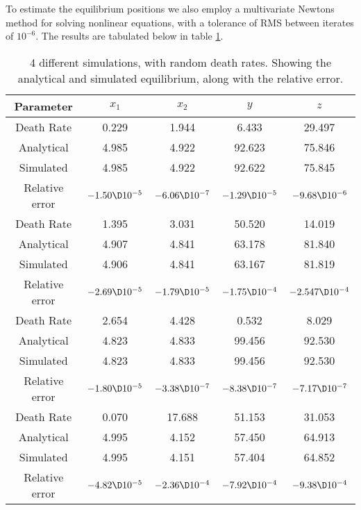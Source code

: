 \documentclass[a4paper,10pt]{article}
\begin{document}
	To estimate the equilibrium positions we also employ a multivariate Newtons method for solving nonlinear equations, with a tolerance of RMS between iterates of $ 10^{-6} $. The results are tabulated below in table \ref{tab:deaths}.
	
	\begin{table}[H]
		\centering
		\begin{tabular}{c|c|c|c|c}
			Parameter & $ x_1 $ & $ x_2 $ & $ y $ & $ z $ \\
			\hline
			\hline
			Death Rate & 0.229 & 1.944 & 6.433 & 29.497  \\
			Analytical & 4.985 & 4.922 & 92.623 & 75.846  \\
			Simulated & 4.985 & 4.922 & 92.622 & 75.845  \\
			Relative error & $ -1.50\D10^{-5} $ & $ -6.06\D10^{-7} $ & $ -1.29\D10^{-5} $ & $ -9.68\D10^{-6} $ \\
			\hline
			\hline
			Death Rate & 1.395 & 3.031 & 50.520 & 14.019  \\
			Analytical & 4.907 & 4.841 & 63.178 & 81.840  \\
			Simulated & 4.906 & 4.841 & 63.167 & 81.819  \\
			Relative error & $-2.69\D10^{-5}$ & $-1.79\D10^{-5}$ & $-1.75\D10^{-4}$ & $-2.547\D10^{-4}$  \\
			\hline
			\hline
			Death Rate & 2.654 & 4.428 & 0.532 & 8.029  \\
			Analytical & 4.823 & 4.833 & 99.456 & 92.530  \\
			Simulated & 4.823 & 4.833 & 99.456 & 92.530  \\
			Relative error & $-1.80\D10^{-5}$ & $-3.38\D10^{-7}$ & $-8.38\D10^{-7}$ & $-7.17\D10^{-7}$  \\
			\hline
			\hline
			Death Rate & 0.070 & 17.688 & 51.153 & 31.053  \\
			Analytical & 4.995 & 4.152 & 57.450 & 64.913  \\
			Simulated & 4.995 & 4.151 & 57.404 & 64.852  \\
			Relative error & $-4.82\D10^{-5}$ & $-2.36\D10^{-4}$ & $-7.92\D10^{-4}$ & $-9.38\D10^{-4}$
		\end{tabular}
	\caption{4 different simulations, with random death rates. Showing the analytical and simulated equilibrium, along with the relative error.}
	\label{tab:deaths}
	\end{table}
	
	
	\newpage
\end{document}
